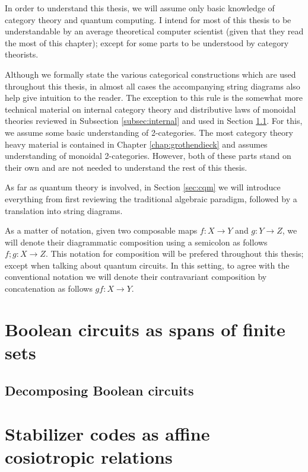 \documentclass[12pt]{ociamthesis}  %
\begin{document}
\label{chap:background}
In order to understand this thesis, we will assume only basic knowledge of category theory and quantum computing.  I intend for most of this thesis to be understandable by an average theoretical computer scientist  (given that they read the most of this chapter); except for some parts to be understood by category theorists.


Although we formally state the various categorical constructions which are used throughout this thesis, in almost all cases the accompanying string diagrams also help give intuition to the reader.  The exception to this rule is the somewhat more technical  material on internal category theory and distributive laws of monoidal theories reviewed in Subsection \ref{subsec:internal} and used in Section \ref{sec:dist}.  For this, we assume some basic understanding of 2-categories.  The most category theory heavy material is contained in Chapter \ref{chap:grothendieck} and assumes understanding of monoidal 2-categories.  However, both of these parts stand on their own and are not needed to understand the rest of this thesis.

As far as quantum theory is involved, in Section \ref{sec:cqm} we will introduce everything from first reviewing the traditional algebraic paradigm, followed by a translation into string diagrams.

As a matter of notation, given two composable maps $f:X\to Y$ and $g:Y \to Z$, we will denote their diagrammatic composition using a semicolon as follows $f;g:X\to Z$. This notation for composition will be prefered throughout this thesis; except when talking about quantum circuits.  In this setting, to agree with the conventional notation we will denote their contravariant composition by concatenation as follows $gf:X\to Y$.





\chapter{Boolean circuits as spans of finite sets}
\label{chap:zxa}


\section{Decomposing Boolean circuits}
\label{sec:dist}


\chapter{Stabilizer codes as affine cosiotropic relations}
\label{chap:stab}

\end{document}
